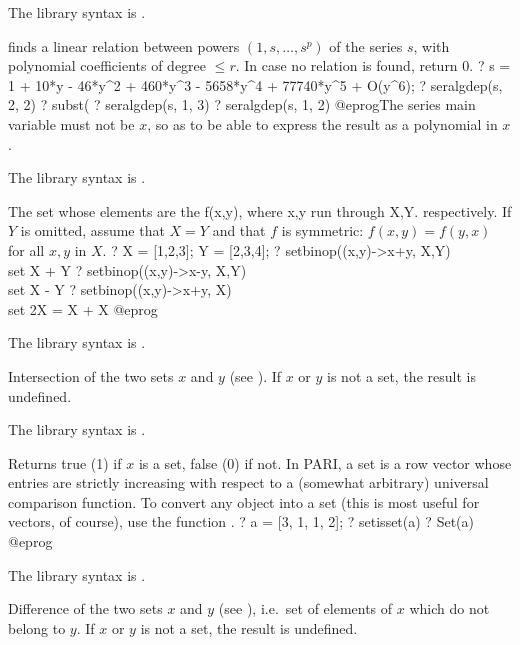 The library syntax is .

\label{se:seralgdep}
 finds a linear relation between powers $(1,s,
\dots, s^p)$ of the series $s$, with polynomial coefficients of degree
$\leq r$. In case no relation is found, return $0$.
\bprog
? s = 1 + 10*y - 46*y^2 + 460*y^3 - 5658*y^4 + 77740*y^5 + O(y^6);
? seralgdep(s, 2, 2)
? subst(%
? seralgdep(s, 1, 3)
? seralgdep(s, 1, 2)
@eprog\noindent The series main variable must not be $x$, so as to be able
to express the result as a polynomial in $x$.

The library syntax is .

\label{se:setbinop}
The set whose elements are the f(x,y), where x,y run through X,Y.
respectively. If $Y$ is omitted, assume that $X = Y$ and that $f$ is symmetric:
$f(x,y) = f(y,x)$ for all $x,y$ in $X$.
\bprog
? X = [1,2,3]; Y = [2,3,4];
? setbinop((x,y)->x+y, X,Y) \\ set X + Y
? setbinop((x,y)->x-y, X,Y) \\ set X - Y
? setbinop((x,y)->x+y, X)   \\ set 2X = X + X
@eprog

The library syntax is .

\label{se:setintersect}
Intersection of the two sets $x$ and $y$ (see ).
If $x$ or $y$ is not a set, the result is undefined.

The library syntax is .

\label{se:setisset}
Returns true (1) if $x$ is a set, false (0) if
not. In PARI, a set is a row vector whose entries are strictly
increasing with respect to a (somewhat arbitrary) universal comparison
function. To convert any object into a set (this is most useful for
vectors, of course), use the function .
\bprog
? a = [3, 1, 1, 2];
? setisset(a)
? Set(a)
@eprog

The library syntax is .

\label{se:setminus}
Difference of the two sets $x$ and $y$ (see ),
i.e.~set of elements of $x$ which do not belong to $y$.
If $x$ or $y$ is not a set, the result is undefined.

